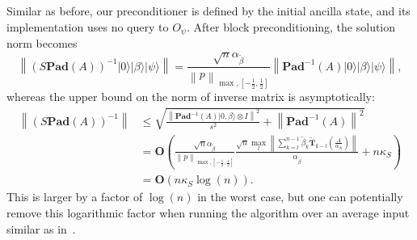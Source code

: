 \documentclass[letterpaper,onecolumn,11pt,accepted=2026-02-14]{quantumarticle}
\newcommand{\norm}[1]{\left\lVert#1\right\rVert}
\theoremstyle{remark}
\theoremstyle{plain}
\newcommand{\ket}[1]{|#1\rangle}
\begin{document}
Similar as before, our preconditioner is defined by the initial ancilla state, and its implementation uses no query to $O_{\psi}$. After block preconditioning, the solution norm becomes
\begin{equation}
    \norm{\left(S\mathbf{Pad}(A)\right)^{-1}\ket{0}\ket{\beta}\ket{\psi}}
    =\frac{\sqrt{n}\alpha_{\widetilde{\beta}}}{\norm{p}_{\max,\left[-\frac{1}{2},\frac{1}{2}\right]}}
    \norm{\mathbf{Pad}^{-1}(A)\ket{0}\ket{\beta}\ket{\psi}},
\end{equation}
whereas the upper bound on the norm of inverse matrix is asymptotically:
\begin{equation}
\begin{aligned}
    \norm{\left(S\mathbf{Pad}(A)\right)^{-1}}
    &\leq\sqrt{\frac{\norm{\mathbf{Pad}^{-1}(A)\ket{0,\beta}\otimes I}^2}{s^2}
    +\norm{\mathbf{Pad}^{-1}(A)}^2}\\
    &=\mathbf{O}\left(\frac{\sqrt{n}\alpha_{\widetilde{\beta}}}{\norm{p}_{\max,\left[-\frac{1}{2},\frac{1}{2}\right]}}\frac{\sqrt{n}\max_{l}\norm{\sum_{k=l}^{n-1}\widetilde\beta_k\widetilde{\mathbf{T}}_{k-l}\left(\frac{A}{\alpha_A}\right)}}{\alpha_{\widetilde{\beta}}}
    +n\kappa_S\right)\\
    &=\mathbf{O}\left(n\kappa_S\log(n)\right).
\end{aligned}
\end{equation}
This is larger by a factor of $\log(n)$ in the worst case, but one can potentially remove this logarithmic factor when running the algorithm over an average input similar as in~\cite{QEVP}.
\end{document}
